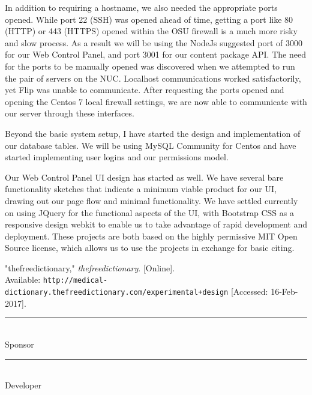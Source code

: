\documentclass[letterpaper, 10pt,titlepage]{article}
\begin{document}
In addition to requiring a hostname, we also needed the appropriate ports opened. While port 22 (SSH) was opened ahead of time, getting a port like 80 (HTTP) or 443 (HTTPS) opened within the OSU firewall is a much more risky and slow process. As a result we will be using the NodeJs suggested port of 3000 for our Web Control Panel, and port 3001 for our content package API. The need for the ports to be manually opened was discovered when we attempted to run the pair of servers on the NUC. Localhost communications worked satisfactorily, yet Flip was unable to communicate. After requesting the ports opened and opening the Centos 7 local firewall settings, we are now able to communicate with our server through these interfaces.

Beyond the basic system setup, I have started the design and implementation of our database tables. We will be using MySQL Community for Centos and have started implementing user logins and our permissions model.

Our Web Control Panel UI design has started as well. We have several bare functionality sketches that indicate a minimum viable product for our UI, drawing out our page flow and minimal functionality. We have settled currently on using JQuery for the functional aspects of the UI, with Bootstrap CSS as a responsive design webkit to enable us to take advantage of rapid development and deployment. These projects are both based on the highly permissive MIT Open Source license, which allows us to use the projects in exchange for basic citing. 


\newpage %
\begin{thebibliography}{9}

"thefreedictionary," \textit{thefreedictionary}. [Online]. \\Available:
\texttt{http://medical-dictionary.thefreedictionary.com/experimental+design} [Accessed: 16-Feb-2017].

\end{thebibliography}



\newpage
\textbf{ }
\vspace{5.0cm}

\noindent\rule{13cm}{0.4pt}\\
Sponsor
\vspace{3.0cm}

\noindent\rule{13cm}{0.4pt}\\
Developer
\vspace{3.0cm}
\end{document}
